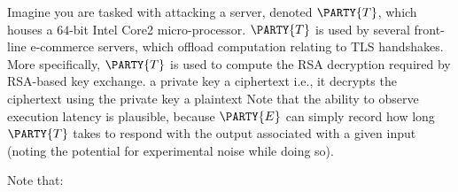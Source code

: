 %



Imagine you are tasked with attacking a server, denoted 
$\PARTY{T}$, 
which houses a $64$-bit Intel Core2 micro-processor.  
$\PARTY{T}$ 
is used by several front-line e-commerce servers, which offload computation 
relating to TLS handshakes.  More specifically, 
$\PARTY{T}$ 
is used to compute the RSA decryption required by RSA-based key exchange.
\DESCINTRO[leak]
{}
{a private key}
{a ciphertext}
{i.e., it decrypts the ciphertext using the private key}
{a  plaintext}
Note that the ability to observe execution latency is plausible, because
$\PARTY{E}$ 
can simply record how long
$\PARTY{T}$ 
takes to respond with the output associated with a given input (noting the potential for experimental noise while doing so).




%
Note that:

